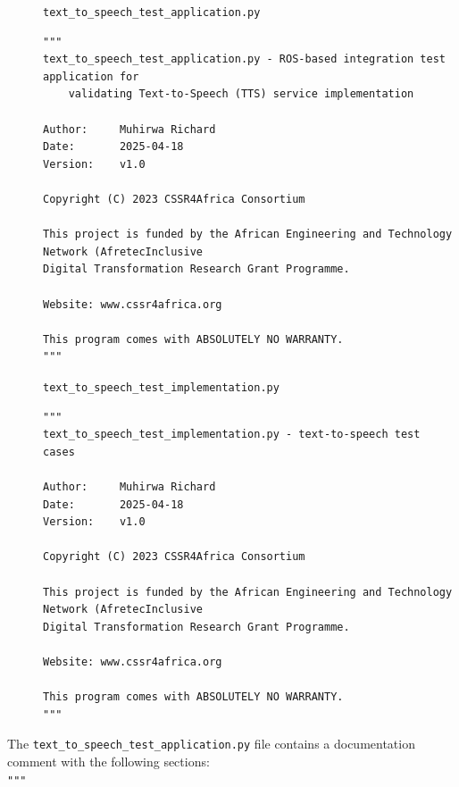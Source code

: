 \documentclass{CSSRforAfrica}
\newcommand{\checkboxChecked}{\fbox{\ding{51}}} %
\begin{document}
\begin{description}

\item[\checkboxChecked] {\small \verb+text_to_speech_test_application.py+}
{\scriptsize \begin{verbatim}
""" 
text_to_speech_test_application.py - ROS-based integration test application for
    validating Text-to-Speech (TTS) service implementation

Author:     Muhirwa Richard
Date:       2025-04-18
Version:    v1.0

Copyright (C) 2023 CSSR4Africa Consortium

This project is funded by the African Engineering and Technology Network (AfretecInclusive
Digital Transformation Research Grant Programme.

Website: www.cssr4africa.org

This program comes with ABSOLUTELY NO WARRANTY.
"""
\end{verbatim} }

\item[\checkboxChecked] {\small \verb+text_to_speech_test_implementation.py+}
{\scriptsize \begin{verbatim}
""" 
text_to_speech_test_implementation.py - text-to-speech test cases

Author:     Muhirwa Richard
Date:       2025-04-18
Version:    v1.0

Copyright (C) 2023 CSSR4Africa Consortium

This project is funded by the African Engineering and Technology Network (AfretecInclusive
Digital Transformation Research Grant Programme.

Website: www.cssr4africa.org

This program comes with ABSOLUTELY NO WARRANTY.
"""
\end{verbatim} }

\end{description}

\noindent The {\small \verb+text_to_speech_test_application.py+} file contains a documentation comment with the following sections:\\

\noindent \verb+"""+
\end{document}
